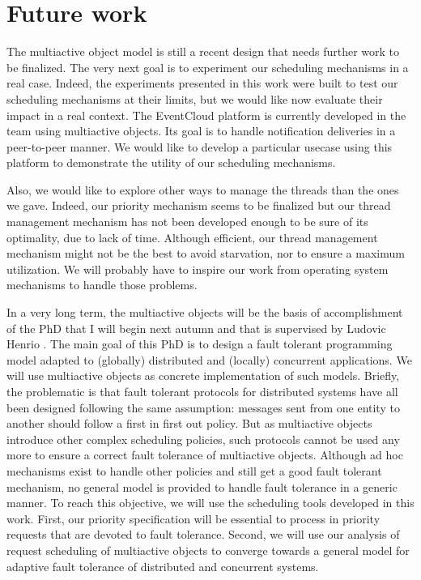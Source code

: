 \documentclass[11pt]{report}
\begin{document}
\section{Future work}
The multiactive object model is still a recent design that needs further work to be finalized. The very next goal is to experiment our scheduling mechanisms in a real case. Indeed, the experiments presented in this work were built to test our scheduling mechanisms at their limits, but we would like now evaluate their impact in a real context. The EventCloud platform \cite{ref:eventcloud} is currently developed in the team using multiactive objects. Its goal is to handle notification deliveries in a peer-to-peer manner. We would like to develop a particular usecase using this platform to demonstrate the utility of our scheduling mechanisms. 

Also, we would like to explore other ways to manage the threads than the ones we gave. Indeed, our priority mechanism seems to be finalized but our thread management mechanism has not been developed enough to be sure of its optimality, due to lack of time. Although efficient, our thread management mechanism might not be the best to avoid starvation, nor to ensure a maximum utilization. We will probably have to inspire our work from operating system mechanisms to handle those problems.

In a very long term, the multiactive objects will be the basis of  accomplishment of the PhD that I will begin next autumn and that is supervised by Ludovic Henrio \cite{ref:these}. The main goal of this PhD is to design a fault tolerant programming model adapted to (globally) distributed and (locally) concurrent applications. We will use multiactive objects as concrete implementation of such models. Briefly, the problematic is that fault tolerant protocols for distributed systems have all been designed following the same assumption: messages sent from one entity to another should follow a first in first out policy. But as multiactive objects introduce other complex scheduling policies, such protocols cannot be used any more to ensure a correct fault tolerance of multiactive objects. Although ad hoc mechanisms exist to handle other policies and still get a good fault tolerant mechanism, no general model is provided to handle fault tolerance in a generic manner. To reach this objective, we will use the scheduling tools developed in this work. First, our priority specification will be essential to process in priority requests that are devoted to fault tolerance. Second, we will use our analysis of request scheduling of multiactive objects to converge towards a general model for adaptive fault tolerance of distributed and concurrent systems.




\end{document}

